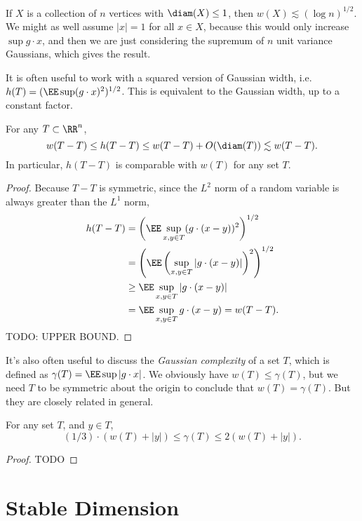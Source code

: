 \begin{example}
	If $X$ is a collection of $n$ vertices with $\diam(X) \leq 1$, then $w(X) \lesssim (\log n)^{1/2}$. We might as well assume $|x| = 1$ for all $x \in X$, because this would only increase $\sup g \cdot x$, and then we are just considering the supremum of $n$ unit variance Gaussians, which gives the result.
\end{example}

It is often useful to work with a squared version of Gaussian width, i.e. $h(T) = (\EE \sup (g \cdot x)^2)^{1/2}$. This is equivalent to the Gaussian width, up to a constant factor.

\begin{theorem}
	For any $T \subset \RR^n$,
	\[ w(T-T) \leq h(T-T) \leq w(T-T) + O(\diam(T)) \lesssim w(T-T). \]
	In particular, $h(T-T)$ is comparable with $w(T)$ for any set $T$.
\end{theorem}
\begin{proof}
	Because $T - T$ is symmetric, since the $L^2$ norm of a random variable is always greater than the $L^1$ norm,
	\begin{align*}
		h(T-T) &= \left(\EE \sup_{x,y \in T} (g \cdot (x-y))^2 \right)^{1/2}\\
		&= \left( \EE \left( \sup_{x,y \in T} |g \cdot (x-y)| \right)^2 \right)^{1/2}\\
		&\geq \EE \sup_{x,y \in T} |g \cdot (x-y)|\\
		&= \EE \sup_{x,y \in T} g \cdot (x-y) = w(T-T).
	\end{align*}
	TODO: UPPER BOUND.
\end{proof}

It's also often useful to discuss the {\it Gaussian complexity} of a set $T$, which is defined as $\gamma(T) = \EE \sup |g \cdot x|$. We obviously have $w(T) \leq \gamma(T)$, but we need $T$ to be symmetric about the origin to conclude that $w(T) = \gamma(T)$. But they are closely related in general.

\begin{lemma}
	For any set $T$, and $y \in T$,
	\[ (1/3) \cdot (w(T) + |y|) \leq \gamma(T) \leq 2(w(T) + |y|). \]
\end{lemma}
\begin{proof}
	TODO
\end{proof}

\section{Stable Dimension}

